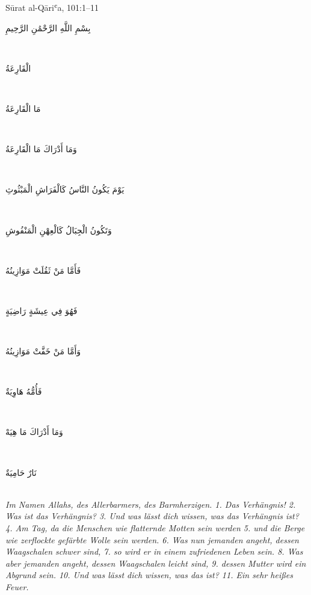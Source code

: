 \begin{quranvers}{Sūrat al-Qāriʿa, 101:1--11}
{\quranfont\begin{Arabic}
بِسْمِ اللَّهِ الرَّحْمَٰنِ الرَّحِيمِ
\end{Arabic}}\\[2mm]
{\quranfont\begin{Arabic}
الْقَارِعَةُ
\end{Arabic}}\\[2mm]
{\quranfont\begin{Arabic}
مَا الْقَارِعَةُ
\end{Arabic}}\\[2mm]
{\quranfont\begin{Arabic}
وَمَا أَدْرَاكَ مَا الْقَارِعَةُ
\end{Arabic}}\\[2mm]
{\quranfont\begin{Arabic}
يَوْمَ يَكُونُ النَّاسُ كَالْفَرَاشِ الْمَبْثُوثِ
\end{Arabic}}\\[2mm]
{\quranfont\begin{Arabic}
وَتَكُونُ الْجِبَالُ كَالْعِهْنِ الْمَنْفُوشِ
\end{Arabic}}\\[2mm]
{\quranfont\begin{Arabic}
فَأَمَّا مَنْ ثَقُلَتْ مَوَازِينُهُ
\end{Arabic}}\\[2mm]
{\quranfont\begin{Arabic}
فَهُوَ فِي عِيشَةٍ رَاضِيَةٍ
\end{Arabic}}\\[2mm]
{\quranfont\begin{Arabic}
وَأَمَّا مَنْ خَفَّتْ مَوَازِينُهُ
\end{Arabic}}\\[2mm]
{\quranfont\begin{Arabic}
فَأُمُّهُ هَاوِيَةٌ
\end{Arabic}}\\[2mm]
{\quranfont\begin{Arabic}
وَمَا أَدْرَاكَ مَا هِيَهْ
\end{Arabic}}\\[2mm]
{\quranfont\begin{Arabic}
نَارٌ حَامِيَةٌ
\end{Arabic}}\\[3mm]
\emph{Im Namen Allahs, des Allerbarmers, des Barmherzigen. 1. Das Verhängnis! 2. Was ist das
Verhängnis? 3. Und was lässt dich wissen, was das Verhängnis ist? 4. Am Tag, da die Menschen
wie flatternde Motten sein werden 5. und die Berge wie zerflockte gefärbte Wolle sein werden.
6. Was nun jemanden angeht, dessen Waagschalen schwer sind, 7. so wird er in einem
zufriedenen Leben sein. 8. Was aber jemanden angeht, dessen Waagschalen leicht sind, 9.
dessen Mutter wird ein Abgrund sein. 10. Und was lässt dich wissen, was das ist? 11. Ein sehr
heißes Feuer.}
\end{quranvers}

